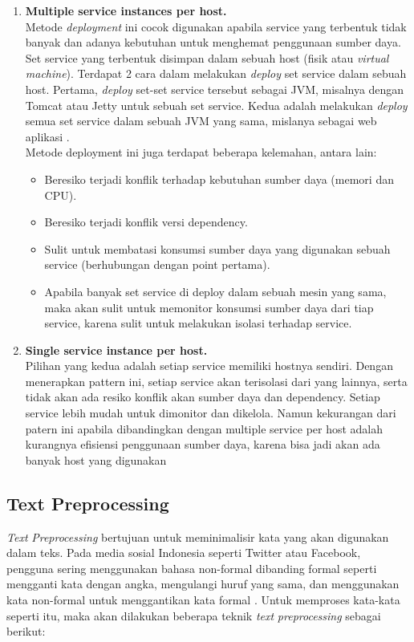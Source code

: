 \begin{enumerate}[leftmargin=*]
	\item \textbf{Multiple service instances per host.}\\
	Metode \textit{deployment} ini cocok digunakan apabila service yang terbentuk tidak banyak dan adanya kebutuhan untuk menghemat penggunaan sumber daya. Set service yang terbentuk disimpan dalam sebuah host (fisik atau \textit{virtual machine}). Terdapat 2 cara dalam melakukan \textit{deploy} set service dalam sebuah host. Pertama, \textit{deploy} set-set service tersebut sebagai JVM, misalnya dengan Tomcat atau Jetty untuk sebuah set service. Kedua adalah melakukan \textit{deploy} semua set service dalam sebuah JVM yang sama, mislanya sebagai web aplikasi \cite{6}.\\
	Metode deployment ini juga terdapat beberapa kelemahan, antara lain:
	\begin{itemize}[leftmargin=*]
		\item Beresiko terjadi konflik terhadap kebutuhan sumber daya (memori dan CPU).
		\item Beresiko terjadi konflik versi dependency.
		\item Sulit untuk membatasi konsumsi sumber daya yang digunakan sebuah service (berhubungan dengan point pertama).
		\item Apabila banyak set service di deploy dalam sebuah mesin yang sama, maka akan sulit untuk memonitor konsumsi sumber daya dari tiap service, karena sulit untuk melakukan isolasi terhadap service.
	\end{itemize}
	\item \textbf{Single service instance per host.}\\
	Pilihan yang kedua adalah setiap service memiliki hostnya sendiri. Dengan menerapkan pattern ini, setiap service akan terisolasi dari yang lainnya, serta tidak akan ada resiko konflik akan sumber daya dan dependency. Setiap service lebih mudah untuk dimonitor dan dikelola. Namun kekurangan dari patern ini apabila dibandingkan dengan multiple service per host adalah kurangnya efisiensi penggunaan sumber daya, karena bisa jadi akan ada banyak host yang digunakan \cite{9}
\end{enumerate}
\subsection{Text Preprocessing}
\textit{Text} \textit{Preprocessing} bertujuan untuk meminimalisir 
kata yang akan digunakan dalam teks. Pada media sosial Indonesia seperti 
Twitter atau Facebook, pengguna sering menggunakan bahasa non-formal 
dibanding formal seperti mengganti kata dengan angka, mengulangi huruf 
yang sama, dan menggunakan kata non-formal untuk menggantikan kata 
formal \cite{5}. Untuk memproses kata-kata seperti itu, maka akan 
dilakukan beberapa teknik \textit{text} \textit{preprocessing }
sebagai berikut: 
